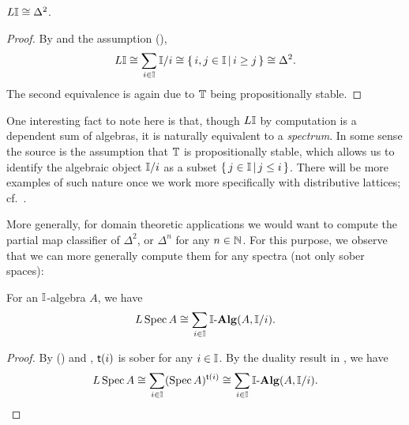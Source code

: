 \begin{corollary}[\AxiomSQCI]
  $L \mathbb{I} \cong \Delta^2$.
\end{corollary}
\begin{proof}
  By  and the assumption (\AxiomSQCI),
  \[ L\mathbb{I} \cong \sum_{i \in \mathbb{I}}\mathbb{I}/i \cong \left\{\,i,j \in \mathbb{I}\,\middle|\,i \ge j\,\right\} \cong \Delta^2\text{.} \]
  The second equivalence is again due to $\mathbb{T}$ being propositionally stable.
\end{proof}

\begin{remark}\label{rem:alggeoI}
  One interesting fact to note here is that, though $L\mathbb{I}$ by computation is a dependent sum of algebras, it is naturally equivalent to a \emph{spectrum}. In some sense the source is the assumption that $\mathbb{T}$ is propositionally stable, which allows us to identify the algebraic object $\mathbb{I}/i$ as a subset $\left\{\,j \in \mathbb{I}\,\middle|\,j \le i\,\right\}$. There will be more examples of such nature once we work more specifically with distributive lattices; cf.\ .
\end{remark}

More generally, for domain theoretic applications we would want to compute the partial map classifier of $\Delta^2$, or $\Delta^n$ for any $n\in\mathbb{N}$. For this purpose, we observe that we can more generally compute them for any spectra (not only sober spaces):

\begin{proposition}[\AxiomSQCI]\label{prop:liftofsober}
  For an $\mathbb{I}$-algebra $A$, we have
  \[ L\operatorname{Spec} A \cong \sum_{i \in \mathbb{I}}\mathbb{I}\text{-}\mathbf{Alg}(A,\mathbb{I}/i)\text{.} \]
\end{proposition}
\begin{proof}
  By (\AxiomSQCI) and , $\mathsf{t}(i)$ is sober for any $i \in \mathbb{I}$. By the duality result in , we have
  \[ L\operatorname{Spec} A \cong \sum_{i \in \mathbb{I}}(\operatorname{Spec} A)^{\mathsf{t}(i)}\cong \sum_{i \in \mathbb{I}}\mathbb{I}\text{-}\mathbf{Alg}(A,\mathbb{I}/i). \qedhere \]
\end{proof}

